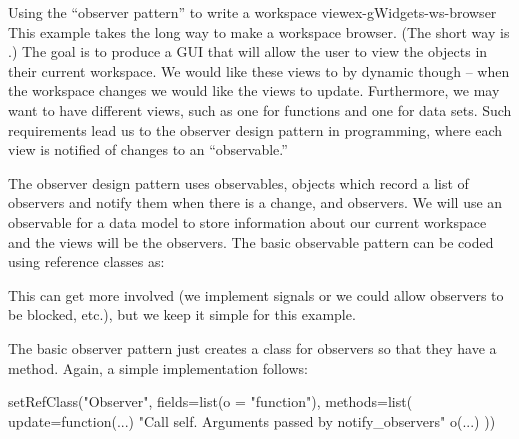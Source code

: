 \begin{example}{Using the ``observer pattern'' to write a workspace view}{ex-gWidgets-ws-browser}
This example takes the long way to make a workspace browser. (The
short way is .) The goal is to produce a GUI
that will allow the user to view the objects in their current
workspace. We would like these views to by dynamic though -- when the
workspace changes we would like the views to update. Furthermore, we
may want to have different views, such as one for functions and one
for data sets. Such requirements lead us to the observer design
pattern in programming, where each view is notified of changes to an
``observable.''

The observer design pattern uses observables, objects which record a
list of observers and notify them when there is a change, and
observers. We will use an observable for a data model to store
information about our current workspace and the views will be the
observers. The basic observable pattern can be coded using reference classes
as:

\begin{Schunk}
\end{Schunk}
%
This can get more involved (we implement signals or we could allow
observers to be blocked, etc.), but we keep
it simple for this example. 


The basic observer pattern just creates a class for observers so that
they have a  method. Again, a simple implementation
follows:


\begin{Schunk}
\begin{Sinput}
 setRefClass("Observer",
       fields=list(o = "function"),
       methods=list(
         update=function(...) {
           "Call self. Arguments passed by notify_observers"
           o(...)
         }))
\end{Sinput}
\end{Schunk}
%


\end{example}
